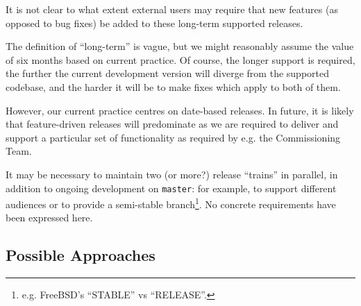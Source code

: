 \documentclass[DM,toc]{lsstdoc}
\begin{document}
It is not clear to what extent external users may require that new features
(as opposed to bug fixes) be added to these long-term supported releases.

The definition of ``long-term'' is vague, but we might reasonably assume the
value of six months based on current practice. Of course, the longer support
is required, the further the current development version will diverge from the
supported codebase, and the harder it will be to make fixes which apply to
both of them.

However, our current practice centres on date-based releases. In future, it
is likely that feature-driven releases will predominate as we are required to
deliver and support a particular set of functionality as required by e.g. the
Commissioning Team.

It may be necessary to maintain two (or more?) release ``trains'' in parallel,
in addition to ongoing development on \texttt{master}: for example, to support
different audiences or to provide a semi-stable branch\footnote{e.g. FreeBSD's
``STABLE'' vs ``RELEASE''.}. No concrete requirements have been expressed
here.

\subsection{Possible Approaches}
\end{document}
